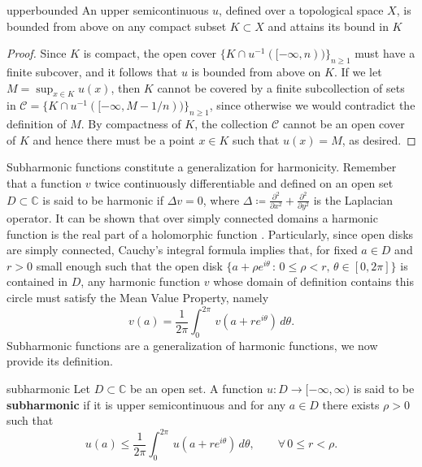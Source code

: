\begin{mytheo}{}{upperbounded}
An upper semicontinuous $u$, defined over a topological space $X$, is bounded from above on any compact subset $K\subset X$ and attains its bound in $K$
\end{mytheo}

\begin{proof}
Since $K$ is compact, the open cover $\{ K\cap u^{-1}([-\infty,n))\}_{n\geq 1}$ must have a finite subcover, and it follows that $u$ is bounded from above on $K$. If we let $M=\sup_{x\in K}u(x)$, then $K$ cannot be covered by a finite subcollection of sets in $\mathcal{C}=\{ K\cap u^{-1}([-\infty,M-1/n))\}_{n\geq 1}$, since otherwise we would contradict the definition of $M$. By compactness of $K$, the collection $\mathcal{C}$ cannot be an open cover of $K$ and hence there must be a point $x\in K$ such that $u(x) = M$, as desired. 
\end{proof}

Subharmonic functions constitute a generalization for harmonicity. Remember that a function $v$ twice continuously differentiable and defined on an open set $D \subset \mathbb{C}$ is said to be harmonic if $\Delta v=0$, where $\Delta \coloneqq \frac{\partial^2}{\partial x^2}+\frac{\partial^2}{\partial y ^2}$ is the Laplacian operator. It can be shown that over simply connected domains a harmonic function is the real part of a holomorphic function \cite[Theorem 1.1.2]{ransford}. Particularly, since open disks are simply connected, Cauchy's integral formula implies that, for fixed $a\in D$ and $r>0$ small enough such that the open disk $\{a+\rho e^{i\theta}\,:\, 0\leq \rho<r,\, \theta\in [0,2\pi]\}$ is contained in $D$, any harmonic function $v$ whose domain of definition contains this circle must satisfy the Mean Value Property, namely
\begin{equation}\label{harmonicity}
v(a) = \frac{1}{2\pi} \int_{0}^{2\pi} \,v(a+re^{i\theta})\,d\theta.
\end{equation}
Subharmonic functions are a generalization of harmonic functions, we now provide its definition.

\begin{mydef}{}{subharmonic}
Let $D\subset \mathbb{C}$ be an open set. A function $u:D \rightarrow [-\infty,\infty)$ is said to be {\bf subharmonic} if it is upper semicontinuous and for any $a\in D$ there exists $\rho>0$ such that
\begin{equation}\label{localsubmean}
u(a) \leq  \frac{1}{2\pi} \int_{0}^{2\pi} \,u(a+re^{i\theta})\,d\theta, \qquad \forall \,0\leq r < \rho.
\end{equation}
\end{mydef}

